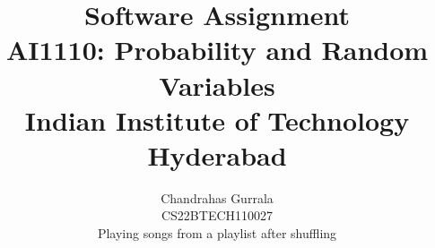 \documentclass[12pt, journal]{IEEEtran}
\title{Software Assignment \\ \Large AI1110: Probability and Random Variables \\ \large Indian Institute of Technology Hyderabad}
\author{Chandrahas Gurrala \\ \normalsize CS22BTECH110027\\ \large Playing songs from a playlist after shuffling}
\DeclareMathOperator*{\Res}{Res}
\begin{document}
	\newtheorem{theorem}{Theorem}[section]
	\newtheorem{problem}{Problem}
	\newtheorem{proposition}{Proposition}[section]
	\newtheorem{lemma}{Lemma}[section]
	\newtheorem{corollary}[theorem]{Corollary}
	\newtheorem{example}{Example}[section]
	\newtheorem{definition}[problem]{Definition}
	\newcommand{\BEQA}{\begin{eqnarray}}
	\newcommand{\EEQA}{\end{eqnarray}}
	\newcommand{\define}{\stackrel{\triangle}{=}}

	


	\providecommand{\mbf}{\mathbf}
	\providecommand{\pr}[1]{\ensuremath{\Pr\left(#1\right)}}
	\providecommand{\qfunc}[1]{\ensuremath{Q\left(#1\right)}}
	\providecommand{\sbrak}[1]{\ensuremath{{}\left[#1\right]}}
	\providecommand{\lsbrak}[1]{\ensuremath{{}\left[#1\right.}}
	\providecommand{\rsbrak}[1]{\ensuremath{{}\left.#1\right]}}
	\providecommand{\brak}[1]{\ensuremath{\left(#1\right)}}
	\providecommand{\lbrak}[1]{\ensuremath{\left(#1\right.}}
	\providecommand{\rbrak}[1]{\ensuremath{\left.#1\right)}}
	\providecommand{\cbrak}[1]{\ensuremath{\left\{#1\right\}}}
	\providecommand{\lcbrak}[1]{\ensuremath{\left\{#1\right.}}
	\providecommand{\rcbrak}[1]{\ensuremath{\left.#1\right\}}}
	\theoremstyle{remark}
	\newtheorem{rem}{Remark}
	\newcommand{\sgn}{\mathop{\mathrm{sgn}}}
	\providecommand{\abs}[1]{\left\vert#1\right\vert}
	\providecommand{\res}[1]{\Res\displaylimits_{#1}} 
	\providecommand{\norm}[1]{\left\lVert#1\right\rVert}
	\providecommand{\mtx}[1]{\mathbf{#1}}
	\providecommand{\mean}[1]{E\left[ #1 \right]}
	\providecommand{\fourier}{\overset{\mathcal{F}}{ \rightleftharpoons}}
	\providecommand{\system}{\overset{\mathcal{H}}{ \longleftrightarrow}}
	\newcommand{\solution}{\noindent \textbf{Solution: }}
	\newcommand{\cosec}{\,\text{cosec}\,}
	\providecommand{\dec}[2]{\ensuremath{\overset{#1}{\underset{#2}{\gtrless}}}}
	\newcommand{\myvec}[1]{\ensuremath{\begin{pmatrix}#1\end{pmatrix}}}
	\newcommand{\mydet}[1]{\ensuremath{\begin{vmatrix}#1\end{vmatrix}}}
	
\end{document}
